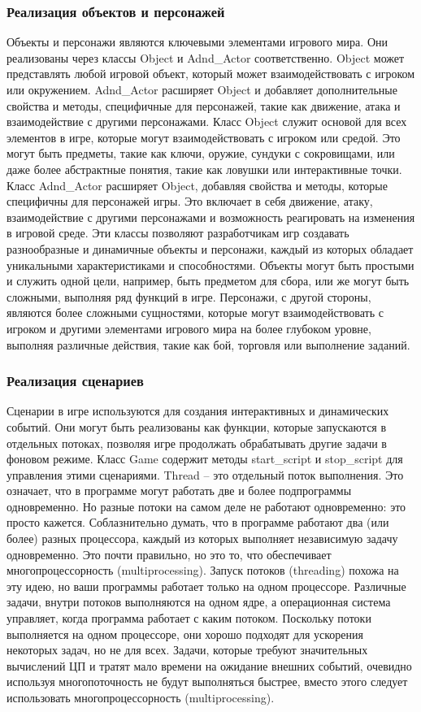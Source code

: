 \subsubsection{Реализация объектов и персонажей}
Объекты и персонажи являются ключевыми элементами игрового мира. Они реализованы через классы Object и Adnd\_Actor соответственно. Object может представлять любой игровой объект, который может взаимодействовать с игроком или окружением. Adnd\_Actor расширяет Object и добавляет дополнительные свойства и методы, специфичные для персонажей, такие как движение, атака и взаимодействие с другими персонажами.
Класс Object служит основой для всех элементов в игре, которые могут взаимодействовать с игроком или средой. Это могут быть предметы, такие как ключи, оружие, сундуки с сокровищами, или даже более абстрактные понятия, такие как ловушки или интерактивные точки.
Класс Adnd\_Actor расширяет Object, добавляя свойства и методы, которые специфичны для персонажей игры. Это включает в себя движение, атаку, взаимодействие с другими персонажами и возможность реагировать на изменения в игровой среде.
Эти классы позволяют разработчикам игр создавать разнообразные и динамичные объекты и персонажи, каждый из которых обладает уникальными характеристиками и способностями. Объекты могут быть простыми и служить одной цели, например, быть предметом для сбора, или же могут быть сложными, выполняя ряд функций в игре. Персонажи, с другой стороны, являются более сложными сущностями, которые могут взаимодействовать с игроком и другими элементами игрового мира на более глубоком уровне, выполняя различные действия, такие как бой, торговля или выполнение заданий.
\subsubsection{Реализация сценариев}
Сценарии в игре используются для создания интерактивных и динамических событий. Они могут быть реализованы как функции, которые запускаются в отдельных потоках, позволяя игре продолжать обрабатывать другие задачи в фоновом режиме. Класс Game содержит методы start\_script и stop\_script для управления этими сценариями. Thread – это отдельный поток выполнения. Это означает, что в программе могут работать две и более подпрограммы одновременно. Но разные потоки на самом деле не работают одновременно: это просто кажется.
Соблазнительно думать, что в программе работают два (или более) разных процессора, каждый из которых выполняет независимую задачу одновременно. Это почти правильно, но это то, что обеспечивает многопроцессорность (multiprocessing).
Запуск потоков (threading) похожа на эту идею, но ваши программы работает только на одном процессоре. Различные задачи, внутри потоков выполняются на одном ядре, а операционная система управляет, когда программа работает с каким потоком.
Поскольку потоки выполняется на одном процессоре, они хорошо подходят для ускорения некоторых задач, но не для всех. Задачи, которые требуют значительных вычислений ЦП и тратят мало времени на ожидание внешних событий, очевидно используя многопоточность не будут выполняться быстрее, вместо этого следует использовать многопроцессорность (multiprocessing).

